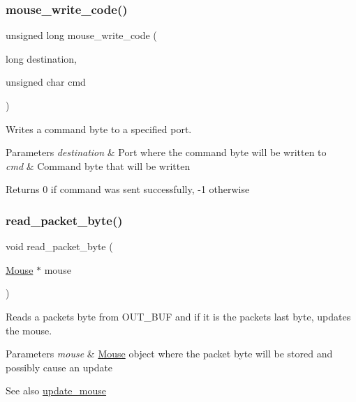 \subsubsection{\texorpdfstring{mouse\+\_\+write\+\_\+code()}{mouse\_write\_code()}}
{\footnotesize\ttfamily unsigned long mouse\+\_\+write\+\_\+code (\begin{DoxyParamCaption}\item[{long}]{destination,  }\item[{unsigned char}]{cmd }\end{DoxyParamCaption})}



Writes a command byte to a specified port. 


\begin{DoxyParams}{Parameters}
{\em destination} & Port where the command byte will be written to \\
\hline
{\em cmd} & Command byte that will be written \\
\hline
\end{DoxyParams}
\begin{DoxyReturn}{Returns}
0 if command was sent successfully, -\/1 otherwise 
\end{DoxyReturn}
\hypertarget{group__mouse_gae7c7eaeeb93ad9d3985b149279b7e142}{}\label{group__mouse_gae7c7eaeeb93ad9d3985b149279b7e142} 
\subsubsection{\texorpdfstring{read\+\_\+packet\+\_\+byte()}{read\_packet\_byte()}}
{\footnotesize\ttfamily void read\+\_\+packet\+\_\+byte (\begin{DoxyParamCaption}\item[{\hyperlink{struct_mouse}{Mouse} $\ast$}]{mouse }\end{DoxyParamCaption})}



Reads a packet\textquotesingle{}s byte from O\+U\+T\+\_\+\+B\+UF and if it is the packet\textquotesingle{}s last byte, updates the mouse. 


\begin{DoxyParams}{Parameters}
{\em mouse} & \hyperlink{struct_mouse}{Mouse} \textquotesingle{}object\textquotesingle{} where the packet byte will be stored and possibly cause an update \\
\hline
\end{DoxyParams}
\begin{DoxySeeAlso}{See also}
\hyperlink{group__mouse_ga89d5f7399006fac6c3e5e0300bd34869}{update\+\_\+mouse} 
\end{DoxySeeAlso}
\hypertarget{group__mouse_gaca7e11158ac82e48f958b7517f6123d4}{}\label{group__mouse_gaca7e11158ac82e48f958b7517f6123d4} 
